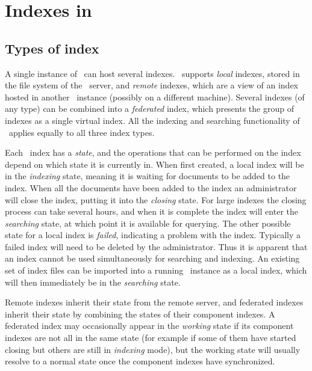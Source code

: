 
\section{Indexes in \Mimir}

\subsection{Types of index}\label{sec:admin:index-types}

A single instance of \Mimir\ can host several indexes.  \Mimir\ supports
{\em local} indexes, stored in the file system of the \Mimir\ server, and
{\em remote} indexes, which are a view of an index hosted in another \Mimir\
instance (possibly on a different machine).  Several indexes (of any type) can
be combined into a {\em federated} index, which presents the group of indexes as
a single virtual index.  All the indexing and searching functionality of
\Mimir\ applies equally to all three index types.

Each \Mimir\ index has a {\em state}, and the operations that can be performed
on the index depend on which state it is currently in.  When first created, a
local index will be in the {\em indexing} state, meaning it is waiting for
documents to be added to the index.  When all the documents have been added to
the index an administrator will close the index, putting it into the {\em
closing} state.  For large indexes the closing process can take several hours,
and when it is complete the index will enter the {\em searching} state, at
which point it is available for querying.  The other possible state for a local
index is {\em failed}, indicating a problem with the index.  Typically a failed
index will need to be deleted by the administrator.  Thus it is apparent that
an index cannot be used simultaneously for searching and indexing.  An existing
set of index files can be imported into a running \Mimir\ instance as a local
index, which will then immediately be in the {\em searching} state.

Remote indexes inherit their state from the remote server, and federated
indexes inherit their state by combining the states of their component indexes.
A federated index may occasionally appear in the {\em working} state if its
component indexes are not all in the same state (for example if some of them
have started closing but others are still in {\em indexing} mode), but the
working state will usually resolve to a normal state once the component indexes
have synchronized.


